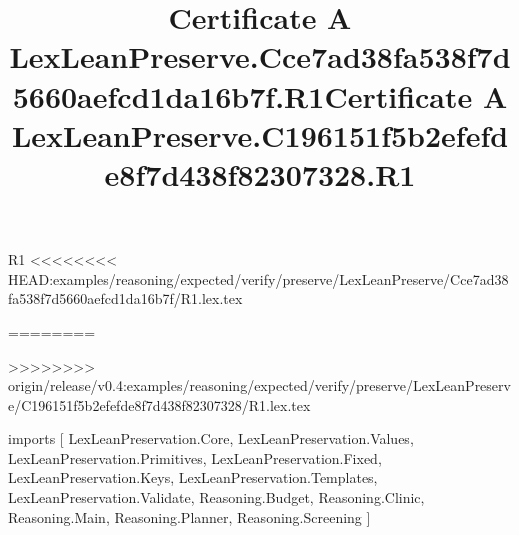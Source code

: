 \begin{lexlean}{R1}
<<<<<<<< HEAD:examples/reasoning/expected/verify/preserve/LexLeanPreserve/Cce7ad38fa538f7d5660aefcd1da16b7f/R1.lex.tex
\title{Certificate A LexLeanPreserve.Cce7ad38fa538f7d5660aefcd1da16b7f.R1}
========
\title{Certificate A LexLeanPreserve.C196151f5b2efefde8f7d438f82307328.R1}
>>>>>>>> origin/release/v0.4:examples/reasoning/expected/verify/preserve/LexLeanPreserve/C196151f5b2efefde8f7d438f82307328/R1.lex.tex
\begin{coremodule}
imports [
  LexLeanPreservation.Core,
  LexLeanPreservation.Values,
  LexLeanPreservation.Primitives,
  LexLeanPreservation.Fixed,
  LexLeanPreservation.Keys,
  LexLeanPreservation.Templates,
  LexLeanPreservation.Validate,
  Reasoning.Budget,
  Reasoning.Clinic,
  Reasoning.Main,
  Reasoning.Planner,
  Reasoning.Screening
]


\end{coremodule}
\end{lexlean}
